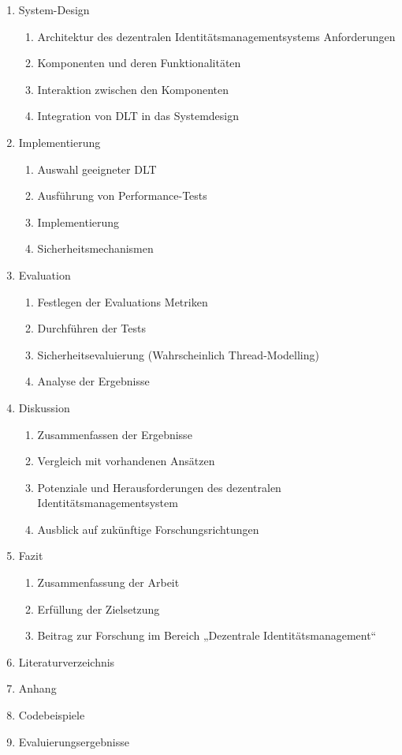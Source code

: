 \begin{enumerate}
	\item System-Design
	\begin{enumerate}
		\item Architektur des dezentralen Identitätsmanagementsystems Anforderungen
		\item Komponenten und deren Funktionalitäten
		\item Interaktion zwischen den Komponenten
		\item Integration von DLT in das Systemdesign
	\end{enumerate}
	
	\item Implementierung
	\begin{enumerate}
		\item Auswahl geeigneter DLT
		\item Ausführung von Performance-Tests
		\item Implementierung
		\item Sicherheitsmechanismen
	\end{enumerate}
	
	\item Evaluation
	\begin{enumerate}
		\item Festlegen der Evaluations Metriken
		\item Durchführen der Tests
		\item Sicherheitsevaluierung (Wahrscheinlich Thread-Modelling)
		\item Analyse der Ergebnisse
	\end{enumerate}
	
	\item Diskussion
	\begin{enumerate}
		\item Zusammenfassen der Ergebnisse
		\item Vergleich mit vorhandenen Ansätzen
		\item Potenziale und Herausforderungen des dezentralen Identitätsmanagementsystem
		\item Ausblick auf zukünftige Forschungsrichtungen
	\end{enumerate}
	
	\item Fazit
	\begin{enumerate}
		\item Zusammenfassung der Arbeit
		\item Erfüllung der Zielsetzung
		\item Beitrag zur Forschung im Bereich „Dezentrale Identitätsmanagement“
	\end{enumerate}
	
	\item Literaturverzeichnis
	\item Anhang
	\item Codebeispiele
	\item Evaluierungsergebnisse
	
	
\end{enumerate}
